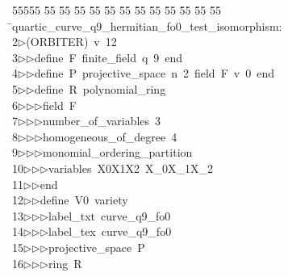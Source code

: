 %
%
\begin{tabbing}
55555 \= 55 \= 55 \= 55 \= 55 \= 55 \= 55 \= 55 \= 55 \= 55 \= 55 \= 55 \= 55 \= \>quartic\_curve\_q9\_hermitian\_fo0\_test\_isomorphism:\\[0pt]
2\>$\triangleright$\>(ORBITER)\ v\ 12\ \\[0pt]
3\>$\triangleright$\>$\triangleright$\>define\ F\ finite\_field\ q\ 9\ end\ \\[0pt]
4\>$\triangleright$\>$\triangleright$\>define\ P\ projective\_space\ n\ 2\ field\ F\ v\ 0\ end\ \\[0pt]
5\>$\triangleright$\>$\triangleright$\>define\ R\ polynomial\_ring\ \\[0pt]
6\>$\triangleright$\>$\triangleright$\>$\triangleright$\>field\ F\ \\[0pt]
7\>$\triangleright$\>$\triangleright$\>$\triangleright$\>number\_of\_variables\ 3\ \\[0pt]
8\>$\triangleright$\>$\triangleright$\>$\triangleright$\>homogeneous\_of\_degree\ 4\ \\[0pt]
9\>$\triangleright$\>$\triangleright$\>$\triangleright$\>monomial\_ordering\_partition\ \\[0pt]
10\>$\triangleright$\>$\triangleright$\>$\triangleright$\>variables\ X0X1X2\ X\_0X\_1X\_2\ \\[0pt]
11\>$\triangleright$\>$\triangleright$\>end\ \\[0pt]
12\>$\triangleright$\>$\triangleright$\>define\ V0\ variety\ \\[0pt]
13\>$\triangleright$\>$\triangleright$\>$\triangleright$\>label\_txt\ curve\_q9\_fo0\ \\[0pt]
14\>$\triangleright$\>$\triangleright$\>$\triangleright$\>label\_tex\ curve\_q9\_fo0\ \\[0pt]
15\>$\triangleright$\>$\triangleright$\>$\triangleright$\>projective\_space\ P\ \\[0pt]
16\>$\triangleright$\>$\triangleright$\>$\triangleright$\>ring\ R\ \\[0pt]

\end{tabbing}
